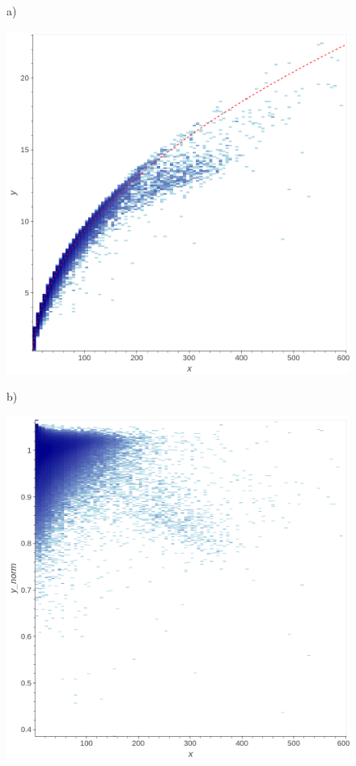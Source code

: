 		\begin{figure}[htb]
			\centering
			\begin{minipage}{.5\textwidth}
				a)\par\medskip %
				\includegraphics[width=\linewidth]{rys03/tfidf.png}
			\end{minipage}%
			\begin{minipage}{.5\textwidth}
				b)\par\medskip %
				\includegraphics[width=\linewidth]{rys03/tfidf_norm.png}

\end{minipage}
\end{figure}
